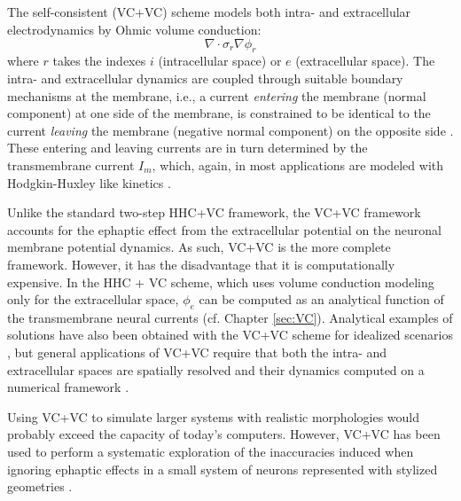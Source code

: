 \subsection{}
The self-consistent (VC+VC) scheme models both intra- and extracellular electrodynamics by Ohmic volume conduction:
\begin{equation}
\nabla \cdot \sigma_r \nabla \phi_r
\end{equation}
where $r$ takes the indexes $i$ (intracellular space) or $e$ (extracellular space). The intra- and extracellular dynamics are coupled through suitable boundary mechanisms at the membrane, i.e., a current \textit{entering} the membrane (normal component) at one side of the membrane, is constrained to be identical to the current \textit{leaving} the membrane (negative normal component) on the opposite side  \citep{Krassowska1994}. These entering and leaving currents are in turn determined by the transmembrane current $I_m$, which, again, in most applications are modeled with Hodgkin-Huxley like kinetics \citep{Agudelo-Toro2013, Tveito2017}. 

Unlike the standard two-step HHC+VC framework, the VC+VC framework accounts for the ephaptic effect  from the extracellular potential on the neuronal membrane potential dynamics. As such, VC+VC is the more complete framework. However, it has the disadvantage that it is computationally expensive. In the HHC + VC scheme, which uses volume conduction modeling only for the extracellular space, $\phi_e$ can be computed as an analytical function of the transmembrane neural currents (cf. Chapter \ref{sec:VC}). Analytical examples of solutions have also been obtained with the VC+VC scheme for idealized scenarios 
 \citep{Krassowska1994}, but general applications of VC+VC require that both the intra- and extracellular spaces are spatially resolved and their dynamics computed on a numerical framework \citep{Agudelo-Toro2013, Tveito2017}. 

Using VC+VC to simulate larger systems with realistic morphologies would probably exceed the capacity of today's computers. However, VC+VC has been used to perform a systematic exploration of the inaccuracies induced when ignoring ephaptic effects in a small system of neurons represented with stylized geometries  \citep{Tveito2019}.




